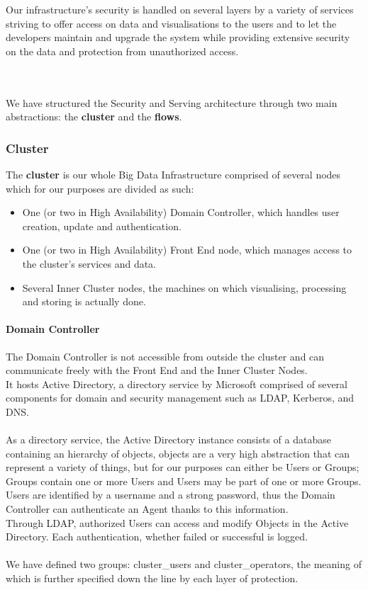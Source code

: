 Our infrastructure's security is handled on several layers by a variety of services striving to offer access on data and visualisations to the users and to let the developers maintain and upgrade the system while providing extensive security on the data and protection from unauthorized access.

\\
\\

We have structured the Security and Serving architecture through two main abstractions: the \textbf{cluster} and the \textbf{flows}.
\subsubsection{Cluster}
The \textbf{cluster} is our whole Big Data Infrastructure comprised of several nodes which for our purposes are divided as such:
\begin{itemize}
	\item One (or two in High Availability) Domain Controller, which handles user creation, update and authentication.
	\item One (or two in High Availability) Front End node, which manages access to the cluster's services and data.
	\item Several Inner Cluster nodes, the machines on which visualising, processing and storing is actually done.
\end{itemize}

\paragraph{Domain Controller}
The Domain Controller is not accessible from outside the cluster and can communicate freely with the Front End and the Inner Cluster Nodes.\\
It hosts Active Directory, a directory service by Microsoft comprised of several components for domain and security management such as LDAP, Kerberos, and DNS.\\ \\
As a directory service, the Active Directory instance consists of a database containing an hierarchy of objects, objects are a very high abstraction that can represent a variety of things, but for our purposes can either be Users or Groups; Groups contain one or more Users and Users may be part of one or more Groups. \\Users are identified by a username and a strong password, thus the Domain Controller can authenticate an Agent thanks to this information. \\
Through LDAP, authorized Users can access and modify Objects in the Active Directory. Each authentication, whether failed or successful is logged.\\ \\
We have defined two groups: cluster\_users and cluster\_operators, the meaning of which is further specified down the line by each layer of protection.

